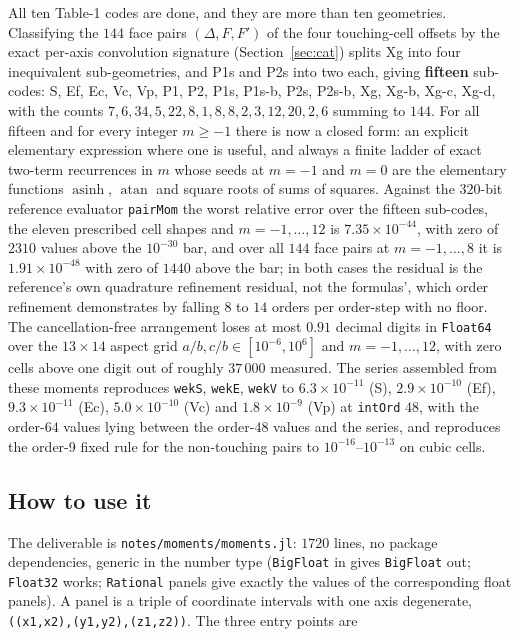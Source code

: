 \documentclass[11pt]{article}
\theoremstyle{remark}
\newcommand{\asinh}{\operatorname{asinh}}
\newcommand{\atan}{\operatorname{atan}}
\newcommand{\code}[1]{\texttt{#1}}
\begin{document}
All ten Table-1 codes are done, and they are more than ten geometries. Classifying the
$144$ face pairs $(\Delta, F, F')$ of the four touching-cell offsets by the exact per-axis
convolution signature (Section~\ref{sec:cat}) splits Xg into four inequivalent
sub-geometries, and P1s and P2s into two each, giving \textbf{fifteen} sub-codes:
S, Ef, Ec, Vc, Vp, P1, P2, P1s, P1s-b, P2s, P2s-b, Xg, Xg-b, Xg-c, Xg-d, with the counts
$7, 6, 34, 5, 22, 8, 1, 8, 8, 2, 3, 12, 20, 2, 6$ summing to $144$. For all fifteen and
for every integer $m \ge -1$ there is now a closed form: an explicit elementary expression
where one is useful, and always a finite ladder of exact two-term recurrences in $m$ whose
seeds at $m = -1$ and $m = 0$ are the elementary functions $\asinh$, $\atan$ and square
roots of sums of squares. Against the $320$-bit reference evaluator \code{pairMom} the
worst relative error over the fifteen sub-codes, the eleven prescribed cell shapes and
$m = -1,\ldots,12$ is $7.35\times10^{-44}$, with zero of $2310$ values above the
$10^{-30}$ bar, and over all $144$ face pairs at $m = -1,\ldots,8$ it is
$1.91\times10^{-48}$ with zero of $1440$ above the bar; in both cases the residual is the
reference's own quadrature refinement residual, not the formulas', which order refinement
demonstrates by falling $8$ to $14$ orders per order-step with no floor. The
cancellation-free arrangement loses at most $\mathbf{0.91}$ decimal digits in
\code{Float64} over the $13\times 14$ aspect grid $a/b, c/b \in [10^{-6},10^{6}]$ and
$m = -1,\ldots,12$, with zero cells above one digit out of roughly $37\,000$ measured. The
series assembled from these moments reproduces \code{wekS}, \code{wekE}, \code{wekV} to
$6.3\times10^{-11}$ (S), $2.9\times10^{-10}$ (Ef), $9.3\times10^{-11}$ (Ec),
$5.0\times10^{-10}$ (Vc) and $1.8\times10^{-9}$ (Vp) at \code{intOrd} $48$, with the
order-$64$ values lying between the order-$48$ values and the series, and reproduces the
order-9 fixed rule for the non-touching pairs to $10^{-16}$--$10^{-13}$ on cubic cells.

\subsection{How to use it}
\label{sec:use}

The deliverable is \code{notes/moments/moments.jl}: $1720$ lines, no package
dependencies, generic in the number type (\code{BigFloat} in gives \code{BigFloat} out;
\code{Float32} works; \code{Rational} panels give exactly the values of the corresponding
float panels). A panel is a triple of coordinate intervals with one axis degenerate,
\code{((x1,x2),(y1,y2),(z1,z2))}. The three entry points are
\end{document}
